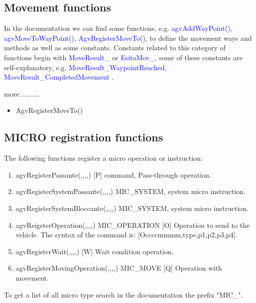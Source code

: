 \subsection{Movement functions}
In the documentation we can find some functions, e.g. \textcolor{blue}{agvAddWayPoint(), agvMoveToWayPoint(), AgvRegisterMoveTo()}, to define the movement ways and methods as well as some constants.
Constants related to this category of functions begin with \textcolor{blue}{MoveResult\_} or \textcolor{blue}{EsitoMov\_}, some of these constants are self-explanatory, e.g. \textcolor{blue}{MoveResult\_WaypointReached, MoveResult\_CompletedMovement }.

more...........
\begin{itemize}
	\item AgvRegisterMoveTo()
\end{itemize}


\subsection{MICRO registration functions}
The following functions register a micro operation or instruction:\\

\begin{enumerate}
	\item agvRegisterPassante(,,,,) [P] command, Pass-through operation.\\
	
	\item agvRegisterSystemPassante(,,,,) MIC\_SYSTEM, system micro instruction.
	\item agvRegisterSystemBloccante(,,,,) MIC\_SYSTEM, system micro instruction.\\
	
	\item agvReigsterOperation(,,,,) MIC\_OPERATION [O] Operation to send to the vehicle. The syntax of the command is: [Occccmmmm,type,p1,p2,p3,p4].\\
	
	\item agvRegisterWait(,,,,) [W] Wait condition operation.\\
	
	\item agvRegisterMovingOperation(,,,,) MIC\_MOVE [Q] Operation with movement.\\
\end{enumerate}

To get a list of all micro type search in the documentation the prefix "{MIC\_}".

